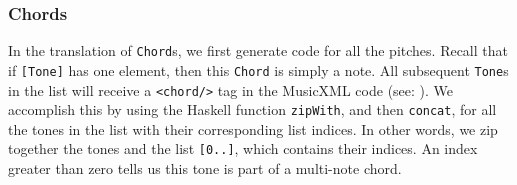 \documentclass{report}
\begin{document}
\subsubsection{Chords}

In the translation of \verb.Chord.s, we first generate code for all the pitches. Recall that if \verb.[Tone]. has one element, then this \verb.Chord. is simply a note. All subsequent \verb.Tone.s in the list will receive a \verb.<chord/>. tag in the MusicXML code (see: ). We accomplish this by using the Haskell function \verb.zipWith., and then \verb.concat., for all the tones in the list with their corresponding list indices. In other words, we zip together the tones and the list \verb![0..]!, which contains their indices. An index greater than zero tells us this tone is part of a multi-note chord.
\end{document}
